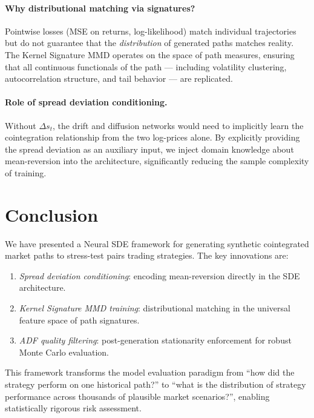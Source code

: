 \documentclass[11pt, a4paper]{article}
\begin{document}
\paragraph{Why distributional matching via signatures?}
Pointwise losses (MSE on returns, log-likelihood) match individual trajectories but do not guarantee that the \emph{distribution} of generated paths matches reality. The Kernel Signature MMD operates on the space of path measures, ensuring that all continuous functionals of the path --- including volatility clustering, autocorrelation structure, and tail behavior --- are replicated.

\paragraph{Role of spread deviation conditioning.}
Without $\Delta s_t$, the drift and diffusion networks would need to implicitly learn the cointegration relationship from the two log-prices alone. By explicitly providing the spread deviation as an auxiliary input, we inject domain knowledge about mean-reversion into the architecture, significantly reducing the sample complexity of training.

\section{Conclusion}
\label{sec:conclusion}

We have presented a Neural SDE framework for generating synthetic cointegrated market paths to stress-test pairs trading strategies. The key innovations are:
\begin{enumerate}[nosep]
    \item \emph{Spread deviation conditioning}: encoding mean-reversion directly in the SDE architecture.
    \item \emph{Kernel Signature MMD training}: distributional matching in the universal feature space of path signatures.
    \item \emph{ADF quality filtering}: post-generation stationarity enforcement for robust Monte Carlo evaluation.
\end{enumerate}

This framework transforms the model evaluation paradigm from ``how did the strategy perform on one historical path?'' to ``what is the distribution of strategy performance across thousands of plausible market scenarios?'', enabling statistically rigorous risk assessment.
\end{document}
